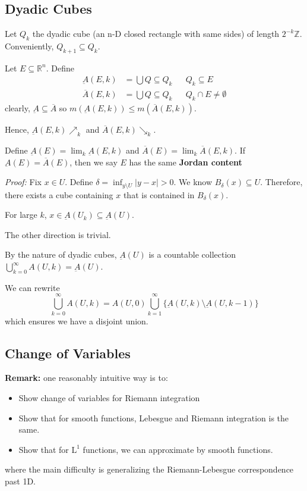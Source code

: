 \documentclass[12pt]{report}
\newcommand{\R}{\mathbb{R}}
\newcommand{\Z}{\mathbb{Z}}
\newcommand{\abs}[1]{\left\vert #1 \right\vert}
\renewcommand{\L}{\text{L}}
\newcommand{\sub}{\subseteq}
\renewcommand{\bar}[1]{\overline{#1}}
\newcommand*{\tbf}[1]{\ifmmode\mathbf{#1}\else\textbf{#1}\fi}
\newenvironment*{tbox}[2][gray]{
    \begin{tcolorbox}[
        parbox=false,
        colback=#1!5!white,
        colframe=#1!75!black,
        breakable,
        title={#2}
    ]}
    {\end{tcolorbox}}
\begin{document}
\subsection*{Dyadic Cubes}
    Let $Q_k$ the dyadic cube (an n-D closed rectangle with same sides) of length $2^{-k} \Z$. Conveniently, $Q_{k+1} \sub Q_k$. 

    Let $E \sub \R^n$. Define 
    \begin{align*}
        \underbar A(E, k) &= \bigcup Q \sub Q_k && Q_k \sub E\\ 
        \bar A(E, k) &= \bigcup Q \sub Q_k && Q_k \cap E \neq \emptyset 
    \end{align*}
    clearly, $\underbar A \sub \bar A$ so $m(\underbar A(E, k)) \leq m(\bar A(E, k))$. 

    Hence, $\underbar A(E, k) \nearrow_k$ and $\bar A(E, k) \searrow_k$.

    Define $\underbar A(E) = \lim_k \underbar A(E, k)$ and $\bar A(E) = \lim_k \bar A(E, k)$. If $\underbar A(E) = \bar A(E)$, then we say $E$ has the same \tbf{Jordan content}

    \begin{tbox}{\textbf{Lemma:} Let $U$ be open, then $U = \underbar A(U)$. Moreover, $U$ is a countable union of disjoint cubes}
        \emph{Proof:} Fix $x \in U$. Define $\delta = \inf_{y \setminus U} \abs{y - x} > 0$. We know $B_{\delta}(x) \sub U$. Therefore, there exists a cube containing $x$ that is contained in $B_{\delta}(x)$.

        For large $k$, $x \in \underbar A(U_k) \sub \underbar A(U)$.

        The other direction is trivial.

        By the nature of dyadic cubes, $\underbar A(U)$ is a countable collection $\bigcup_{k=0}^{\infty} A(U, k) = \underbar A(U)$. 

        We can rewrite 
        \[\bigcup_{k=0}^{\infty} A(U, k)  = A(U, 0) \bigcup_{k=1}^\infty \{\underbar A(U, k) \setminus \underbar A(U, k-1)\}\]
        which ensures we have a disjoint union. 
    \end{tbox}

\subsection*{Change of Variables}
    \tbf{Remark:} one reasonably intuitive way is to:
    \begin{itemize}
        \item Show change of variables for Riemann integration 
        \item Show that for smooth functions, Lebesgue and Riemann integration is the same.
        \item Show that for $\L^1$ functions, we can approximate by smooth functions.
    \end{itemize} 
    where the main difficulty is generalizing the Riemann-Lebesgue correspondence past 1D. 
\end{document}

